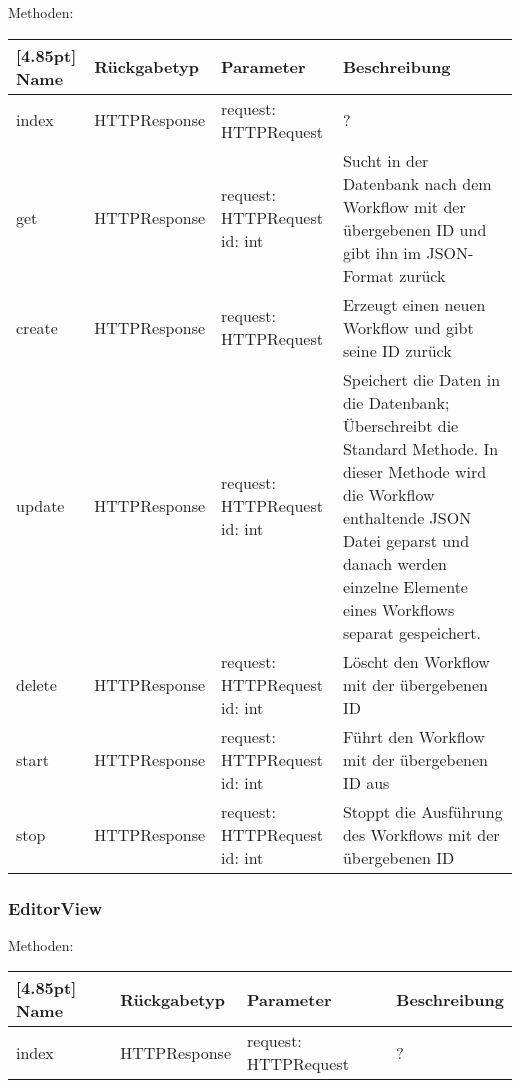     
        Methoden:
        \begin{center}
        	\setlength\tabcolsep{5pt}
        	\renewcommand{\arraystretch}{1.5}
        	
        	\begin{tabularx}{\textwidth}{|l|l|X|X|}
        		\hline
        		\rowcolor[gray]{0.75}[4.85pt]
        		Name & Rückgabetyp & Parameter & Beschreibung \\ \hline 
        		index & HTTPResponse & request: HTTPRequest & ? \\ \hline
        		get & HTTPResponse & request: HTTPRequest
        		id: int & Sucht in der Datenbank nach dem Workflow mit der übergebenen ID und gibt ihn im JSON-Format zurück \\ \hline
        		create & HTTPResponse & request: HTTPRequest & Erzeugt einen neuen Workflow und gibt seine ID zurück \\ \hline
        		update & HTTPResponse & request: HTTPRequest
        		id: int & Speichert die Daten in die Datenbank; Überschreibt die Standard Methode. In dieser Methode wird die Workflow enthaltende JSON Datei geparst und danach werden einzelne Elemente eines Workflows separat gespeichert. \\ \hline
        		delete & HTTPResponse & request: HTTPRequest
        		id: int & Löscht den Workflow mit der übergebenen ID \\ \hline
        		start & HTTPResponse & request: HTTPRequest
        		id: int & Führt den Workflow mit der übergebenen ID aus \\ \hline
        		stop & HTTPResponse & request: HTTPRequest
        		id: int & Stoppt die Ausführung des Workflows mit der übergebenen ID \\ \hline
        	\end{tabularx}
        \end{center}

		\subsubsection{EditorView}
		
		Methoden:
		\begin{center}
		    \setlength\tabcolsep{5pt}
        	\renewcommand{\arraystretch}{1.5}
            	\begin{tabularx}{\textwidth}{|l|l|l|X|}
            	\hline
            	\rowcolor[gray]{0.75}[4.85pt]
        		Name & Rückgabetyp & Parameter & Beschreibung \\ \hline 
                index & HTTPResponse & request: HTTPRequest & ? \\ \hline
            	\end{tabularx}
		\end{center}
		
